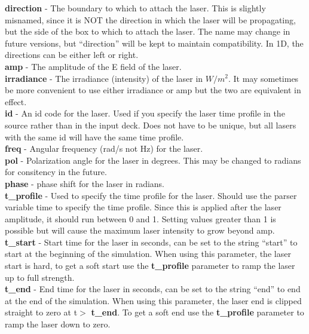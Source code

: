\documentclass[12pt,a4paper]{article}
\newcommand{\emphtext}{\color{warwickdark} \fontfamily{phv}\selectfont\Large\bf}
\newcommand{\inlineemph}[1]{{\color{warwicklight} \bf{#1}}}
\newcommand{\EPOCH}{{\color{warwickdark}\fontfamily{phv}\selectfont{EPOCH}}}
\begin{document}
{\emphtext direction} - The boundary to which to attach the laser. This is
slightly misnamed, since it is NOT the direction in which the laser will be
propagating, but the side of the box to which to attach the laser. The name may
change in future versions, but ``direction'' will be kept to maintain
compatibility. In 1D, the directions can be either left or right.\\

{\emphtext amp} - The amplitude of the E field of the laser.\\

{\emphtext irradiance} - The irradiance (intensity) of the laser in $W/m^2$. It
may sometimes be more convenient to use either irradiance or amp but the two
are equivalent in effect.\\

{\emphtext id} - An id code for the laser. Used if you specify the laser time
profile in the {\EPOCH} source rather than in the input deck. Does not have to be
unique, but all lasers with the same id will have the same time profile.\\

{\emphtext freq} - Angular frequency (rad/s not Hz) for the laser.\\

{\emphtext pol} - Polarization angle for the laser in degrees. This may be
changed to radians for consitency in the future. \\

{\emphtext phase} - phase shift for the laser in radians.\\

{\emphtext t\_profile} - Used to specify the time profile for the laser. Should
use the parser variable time to specify the time profile. Since this is applied
after the laser amplitude, it should run between 0 and 1. Setting values
greater than 1 is possible but will cause the maximum laser intensity to grow
beyond amp.\\

{\emphtext t\_start} - Start time for the laser in seconds, can be set to the
string ``start'' to start at the beginning of the simulation. When using this
parameter, the laser start is hard, to get a soft start use the
\inlineemph{t\_profile} parameter to ramp the laser up to full strength.\\

{\emphtext t\_end} - End time for the laser in seconds, can be set to the
string ``end'' to end at the end of the simulation. When using this parameter,
the laser end is clipped straight to zero at t$>$\inlineemph{t\_end}. To get a
soft end use the \inlineemph{t\_profile} parameter to ramp the laser down to
zero.\\
\end{document}
